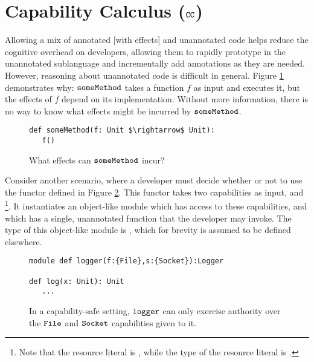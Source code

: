 \vspace{-0.3cm}
\section{Capability Calculus ($\mathtt{CC}$)}
\vspace{-0.3cm}
\label{s:cc}

Allowing a mix of annotated [with effects] and unannotated code helps
reduce the cognitive overhead on developers, allowing them to rapidly
prototype in the unannotated sublanguage and incrementally add
annotations as they are needed. However, reasoning about unannotated
code is difficult in general. Figure \ref{fig:unannotated_reasoning}
demonstrates why: $\mathtt{someMethod}$ takes a function $f$ as input and
executes it, but the effects of $f$ depend on its
implementation. Without more information, there is no way to know what
effects might be incurred by $\mathtt{someMethod}$.

\begin{figure}
\vspace{-0.8cm}
\begin{lstlisting}
def someMethod(f: Unit $\rightarrow$ Unit):
   f()
\end{lstlisting}
\vspace{-0.5cm}
\caption{What effects can $\mathtt{someMethod}$ incur?}
\vspace{-0.5cm}
\label{fig:unannotated_reasoning}
\end{figure}

Consider another scenario, where a developer must decide whether or not
to use the  functor defined in Figure \ref{fig:cc_motivation}. This
functor takes two capabilities as input,  and \footnote{Note that the resource literal is , while the type of the resource literal is
.}. It instantiates an object-like module which has access to these
capabilities, and which has a single, unannotated  function that the
developer may invoke. The type of this object-like module is , which for brevity is assumed to be defined elsewhere.

\begin{figure}
\begin{lstlisting}
module def logger(f:{File},s:{Socket}):Logger

def log(x: Unit): Unit
   ...
\end{lstlisting}
\vspace{-0.5cm}
\caption{In a capability-safe setting, $\mathtt{logger}$ can only exercise authority over the $\mathtt{File}$ and $\mathtt{Socket}$ capabilities given to it.}
\vspace{-0.5cm}
\label{fig:cc_motivation}
\end{figure}

